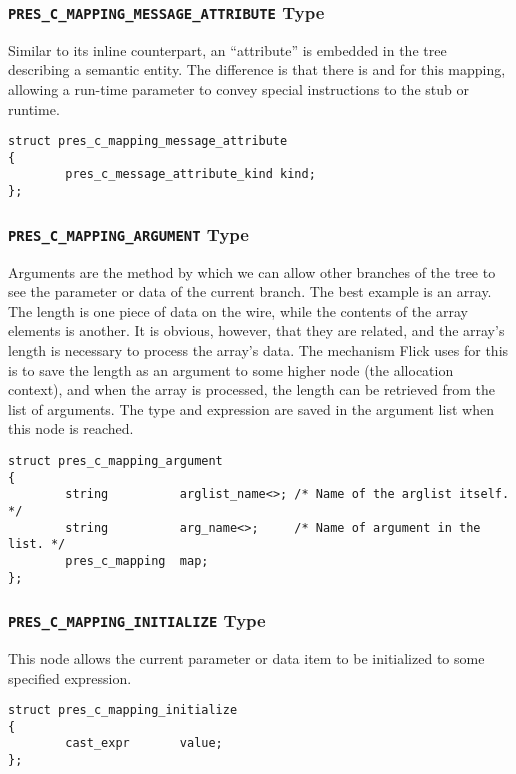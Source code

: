 \subsubsection{\texttt{PRES\_C\_MAPPING\_MESSAGE\_ATTRIBUTE} Type}

Similar to its inline counterpart, an ``attribute'' is embedded in the tree
describing a semantic entity.  The difference is that there is \MINT{} and
\CAST{} for this mapping, allowing a run-time parameter to convey special
instructions to the stub or runtime.

\begin{verbatim}
struct pres_c_mapping_message_attribute
{
        pres_c_message_attribute_kind kind;
};
\end{verbatim}

\subsubsection{\texttt{PRES\_C\_MAPPING\_ARGUMENT} Type}

Arguments are the method by which we can allow other branches of the \PRESC{}
tree to see the parameter or data of the current branch.  The best example is
an array.  The length is one piece of data on the wire, while the contents of
the array elements is another.  It is obvious, however, that they are related,
and the array's length is necessary to process the array's data.  The mechanism
Flick uses for this is to save the length as an argument to some higher node
(the allocation context), and when the array is processed, the length can be
retrieved from the list of arguments.  The \CAST{} type and expression are
saved in the argument list when this node is reached.

\begin{verbatim}
struct pres_c_mapping_argument
{
        string          arglist_name<>; /* Name of the arglist itself. */
        string          arg_name<>;     /* Name of argument in the list. */
        pres_c_mapping  map;
};
\end{verbatim}

\subsubsection{\texttt{PRES\_C\_MAPPING\_INITIALIZE} Type}

This node allows the current parameter or data item to be initialized to some
specified \CAST{} expression.

\begin{verbatim}
struct pres_c_mapping_initialize
{
        cast_expr       value;
};
\end{verbatim}

